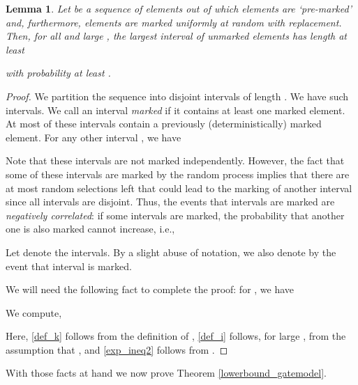 \documentclass{article}
\newtheorem{lem}[thm]{Lemma}
\begin{document}
\begin{lem}
\label{freeinterval_lemma}
   Let  be a sequence of  elements out of which  elements are `pre-marked' and, furthermore,  elements are marked uniformly at random with replacement. Then, for all  and large , the largest interval of unmarked elements has length at least 

 with probability at least 
.
\end{lem}\begin{proof}
We partition the sequence into disjoint intervals of length . We have  such intervals. We call an interval \emph{marked} if it contains at least one marked element. At most  of these intervals contain a previously (deterministically) marked element. For any other interval , we have

Note that these intervals are not marked independently. However, the fact that some of these intervals  are marked by the random process implies that there are at most  random selections left that could lead to the marking of another interval  since all intervals are disjoint. Thus, the events that intervals are marked are \emph{negatively correlated}: if some intervals are marked, the probability that another one is also marked cannot increase, i.e., 
 
Let  denote the intervals. By a slight abuse of notation, we also denote by  the event that interval  is marked.

We will need the following fact to complete the proof: for , we have 


We compute,
 


Here, \eqref{def_k} follows from the definition of , \eqref{def_i} follows, for large , from the assumption that , and \eqref{exp_ineq2} follows from . 
\end{proof}
With those facts at hand we now prove Theorem \ref{lowerbound_gatemodel}.
\end{document}
